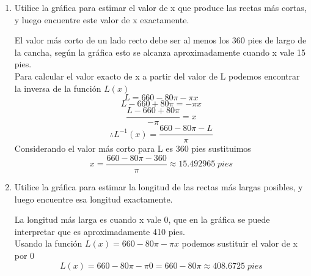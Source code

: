 \documentclass[12pt]{article}
\begin{document}
\begin{enumerate}[label=\alph*)]
\item Utilice la gráfica para estimar el valor de x que produce
las rectas más cortas, y luego encuentre este valor de x
exactamente.

El valor más corto de un lado recto debe ser al menos los 360 pies de largo de la cancha, según la gráfica esto se alcanza aproximadamente cuando x vale 15 pies.\\
Para calcular el valor exacto de x a partir del valor de L podemos encontrar la inversa de la función $L(x)$
\[
 L =  660-80 \pi -\pi x 
\]
\[
 L -660 + 80 \pi = -\pi x 
\]
\[
 \frac{L -660 + 80 \pi}{-\pi}  = x 
\]
\[
\therefore L^{-1}(x) = \frac{660-80\pi-L}{\pi} 
\]
Considerando el valor más corto para L es 360 pies sustituimos
\[
x= \frac{660-80\pi-360}{\pi} \approx 15.492965  \; pies 
\]
\item Utilice la gráfica para estimar la longitud de las rectas más largas posibles, y luego encuentre esa longitud exactamente.

La longitud más larga es cuando x vale 0, que en la gráfica se puede interpretar que es aproximadamente 410 pies.\\
Usando la función $L(x) =  660-80 \pi -\pi x$ podemos sustituir el valor de x por 0
\[
L(x) =  660-80 \pi -\pi 0 = 660-80 \pi \approx408.6725 \; pies
\]
\end{enumerate}
\end{document}

